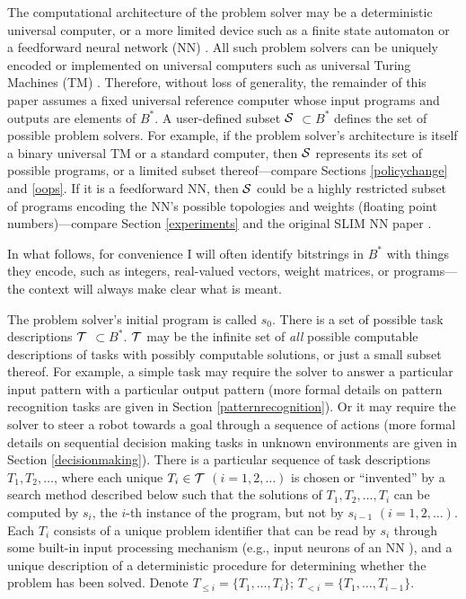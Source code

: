 \documentclass{article}
\begin{document}
The computational architecture of the problem solver may be a deterministic universal computer, 
or a more limited device such as a finite state automaton or a feedforward neural network (NN) \cite{bishop:2006}.
All such problem solvers can be uniquely encoded \cite{Goedel:31} or implemented on universal computers  such as 
universal Turing Machines (TM) \cite{Turing:36}. Therefore,
without loss of generality, the remainder of this paper 
assumes a fixed universal reference computer
whose input programs and outputs are elements of $B^*$.  
A user-defined subset  $\cal S $ $\subset B^*$ defines the set of possible problem solvers. 
For example, if the problem solver's architecture is itself a binary universal TM or a standard 
computer,  then $\cal S$ represents its set of possible programs, or a limited subset thereof---compare Sections \ref{policychange} and \ref{oops}.
If it is a feedforward NN, then $\cal S$ could be a highly restricted subset of programs  
encoding the NN's possible topologies and weights (floating point numbers)---compare Section \ref{experiments}
and the original SLIM NN paper \cite{Schmidhuber:12slimnn}.

In what follows, for convenience
I will often identify bitstrings  in $B^*$ with things  they encode, such
as integers, real-valued vectors, weight matrices, or programs---the context will always
make clear what is meant.



The problem solver's initial program is called $s_0$.
There is  a set of possible task descriptions $\cal T$ $ \subset B^*$.
$\cal T$ may be the infinite set of {\em all} possible computable descriptions of tasks with possibly computable solutions,
or just a small subset thereof.
For example, a simple task may require the solver to answer a particular input pattern
with a particular output pattern (more formal details on
pattern recognition tasks are given in Section \ref{patternrecognition}).
Or it may require the solver to steer a robot towards a goal through a sequence of actions
(more formal details on sequential decision making tasks in unknown environments 
are given in Section \ref{decisionmaking}).
There is a particular sequence of task descriptions $T_1, T_2, \ldots$, 
where each unique $T_i  \in \cal T$ $(i=1, 2, \ldots)$
is chosen or ``invented'' by a search method described below
such that the solutions of  $T_1, T_2, \ldots, T_i$ 
can be computed by $s_i$, the $i$-th instance of the program, 
but not by $s_{i-1}$ $(i=1, 2, \ldots)$.
Each $T_i$ consists of a unique problem identifier
that can be read by  $s_i$ through some built-in input processing mechanism 
(e.g.,  input neurons of an NN  \cite{Schmidhuber:12slimnn}), 
and a unique description of a deterministic procedure for determining 
whether the problem has been solved.
Denote $T_{\leq i}= \{T_1, \ldots, T_i\}$;
$T_{< i}= \{T_1, \ldots, T_{i-1}\}$.
\end{document}
